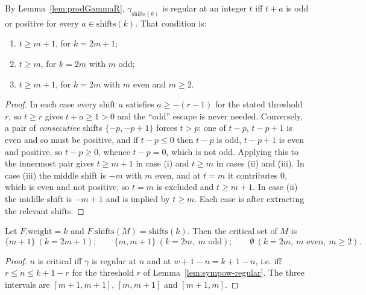 \begin{lemma}[Regularity]
  \label{lem:sympow-regular}
  By Lemma~\ref{lem:prodGammaR}, $\gamma_{\mathrm{shifts}(k)}$ is regular at an integer $t$
  iff $t+a$ is odd or positive for every $a \in \mathrm{shifts}(k)$. That condition is:
  \begin{enumerate}
    \item $t \geq m+1$, for $k=2m+1$;
    \item $t \geq m$, for $k=2m$ with $m$ odd;
    \item $t \geq m+1$, for $k=2m$ with $m$ even and $m \geq 2$.
  \end{enumerate}
\end{lemma}
\begin{proof}
  In each case every shift $a$ satisfies $a \geq -(r-1)$ for the stated threshold $r$, so
  $t \geq r$ gives $t+a \geq 1 > 0$ and the ``odd'' escape is never needed. Conversely, a pair
  of \emph{consecutive} shifts $\{-p,-p+1\}$ forces $t > p$: one of $t-p$, $t-p+1$ is even and
  so must be positive, and if $t-p \le 0$ then $t-p$ is odd, $t-p+1$ is even and positive, so
  $t-p \geq 0$, whence $t-p=0$, which is not odd. Applying this to the innermost pair gives
  $t \geq m+1$ in case (i) and $t \geq m$ in cases (ii) and (iii). In case (iii) the middle
  shift is $-m$ with $m$ even, and at $t=m$ it contributes $0$, which is even and not
  positive, so $t=m$ is excluded and $t \geq m+1$. In case (ii) the middle shift is $-m+1$ and
  is implied by $t \geq m$. Each case is  after extracting the relevant shifts.
\end{proof}

\begin{theorem}
  \label{thm:sympow-critical}
  Let $F.\mathrm{weight}=k$ and $F.\mathrm{shifts}(M)=\mathrm{shifts}(k)$. Then the critical
  set of $M$ is
  \[
    \{m+1\} \ (k=2m+1); \qquad
    \{m,m+1\} \ (k=2m,\ m \text{ odd}); \qquad
    \emptyset \ (k=2m,\ m \text{ even},\ m\geq2).
  \]
\end{theorem}
\begin{proof}
  $n$ is critical iff $\gamma$ is regular at $n$ and at $w+1-n=k+1-n$, i.e. iff
  $r \le n \le k+1-r$ for the threshold $r$ of Lemma~\ref{lem:sympow-regular}. The three
  intervals are $[m+1,m+1]$, $[m,m+1]$ and $[m+1,m]$.
\end{proof}

